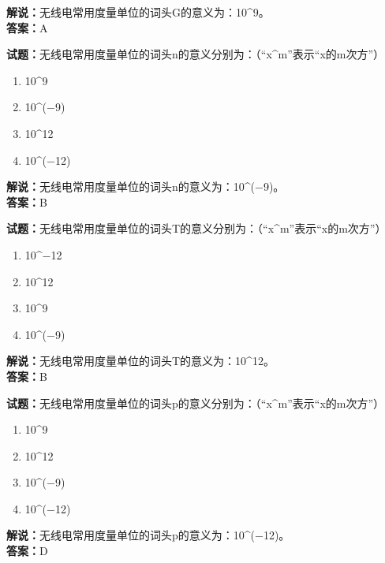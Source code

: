 \documentclass{ctexbook}
\begin{document}
\noindent\textbf{解说：}无线电常用度量单位的词头G的意义为：\num{10}\string^\num{9}\cite[143]{si}。\\
\noindent\textbf{答案：}A

\bigskip

\noindent\textbf{试题：}无线电常用度量单位的词头n的意义分别为：（“x\string^m”表示“x的m次方”）

\begin{enumerate}[leftmargin=3em]
  \item \num{10}\string^\num{9}
  \item \num{10}\string^(\num{-9})
  \item \num{10}\string^\num{12}
  \item \num{10}\string^(\num{-12})
\end{enumerate}

\noindent\textbf{解说：}无线电常用度量单位的词头n的意义为：\num{10}\string^(\num{-9})。\cite[143]{si}\\
\noindent\textbf{答案：}B

\bigskip

\noindent\textbf{试题：}无线电常用度量单位的词头T的意义分别为：（“x\string^m”表示“x的m次方”）

\begin{enumerate}[leftmargin=3em]
  \item \num{10}\string^\num{-12}
  \item \num{10}\string^\num{12}
  \item \num{10}\string^\num{9}
  \item \num{10}\string^(\num{-9})
\end{enumerate}

\noindent\textbf{解说：}无线电常用度量单位的词头T的意义为：\num{10}\string^\num{12}。\cite[143]{si}\\
\noindent\textbf{答案：}B

\bigskip

\noindent\textbf{试题：}无线电常用度量单位的词头p的意义分别为：（“x\string^m”表示“x的m次方”）

\begin{enumerate}[leftmargin=3em]
  \item \num{10}\string^\num{9}
  \item \num{10}\string^\num{12}
  \item \num{10}\string^(\num{-9})
  \item \num{10}\string^(\num{-12})
\end{enumerate}

\noindent\textbf{解说：}无线电常用度量单位的词头p的意义为：\num{10}\string^(\num{-12})。\cite[143]{si}\\
\noindent\textbf{答案：}D
\end{document}
